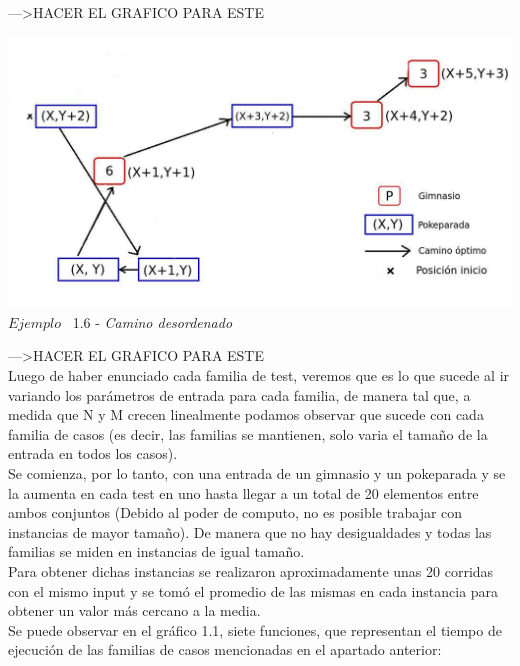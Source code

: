 --->HACER EL GRAFICO PARA ESTE
\vspace*{0.3cm} \vspace*{0.3cm}
  \begin{center}
 \includegraphics[scale=0.6]{./EJ1/desorden.jpeg}
\\ {$Ejemplo$ \ 1.6 - \textit{Camino desordenado}}
  \end{center}
  \vspace*{0.3cm}
--->HACER EL GRAFICO PARA ESTE\\


\indent Luego de haber enunciado cada familia de test, veremos que es lo que sucede al ir variando los parámetros de entrada para cada familia, de manera tal que, a medida que N y M crecen linealmente podamos observar que sucede con cada familia de casos (es decir, las familias se mantienen, solo varia el tamaño de la entrada en todos los casos).\\
Se comienza, por lo tanto, con una entrada de un gimnasio y un pokeparada y se la aumenta en cada test en uno hasta llegar a un total de 20 elementos entre ambos conjuntos (Debido al poder de computo, no es posible trabajar con instancias de mayor tamaño). De manera que no hay desigualdades y todas las familias se miden en instancias de igual tamaño.\\

Para obtener dichas instancias se realizaron aproximadamente unas 20 corridas con el mismo input y se tom\'o el promedio de las mismas en cada instancia para obtener un valor m\'as cercano a la media.\\ 

Se puede observar en el  gráfico 1.1, siete funciones, que representan el tiempo de ejecuci\'on de las familias de casos mencionadas en el apartado anterior:\\

